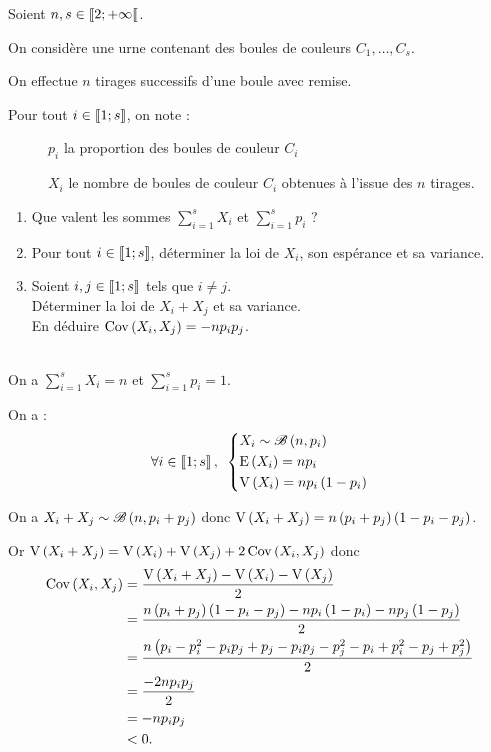 \begin{exo}[Exercice 9]
Soient \(n,s\in\left\llbracket2;+\infty\right\llbracket\).

On considère une urne contenant des boules de couleurs \(C_1,\dots,C_s\).

On effectue \(n\) tirages successifs d'une boule avec remise.

Pour tout \(i\in\left\llbracket1;s\right\rrbracket\), on note : \begin{description}
    \item[] \(p_i\) la proportion des boules de couleur \(C_i\)
    \item[] \(X_i\) le nombre de boules de couleur \(C_i\) obtenues à l'issue des \(n\) tirages.
\end{description}

\begin{enumerate}
    \item Que valent les sommes \(\sum_{i=1}^sX_i\) et \(\sum_{i=1}^sp_i\) ? \\
    \item Pour tout \(i\in\left\llbracket1;s\right\rrbracket\), déterminer la loi de \(X_i\), son espérance et sa variance. \\
    \item Soient \(i,j\in\left\llbracket1;s\right\rrbracket\) tels que \(i\not=j\). \\ Déterminer la loi de \(X_i+X_j\) et sa variance. \\ En déduire \(\operatorname{Cov}\left(X_i,X_j\right)=-np_ip_j\).
\end{enumerate}
\end{exo}

\begin{corr}[1]~\\
On a \(\sum_{i=1}^sX_i=n\) et \(\sum_{i=1}^sp_i=1\).
\end{corr}

\begin{corr}[2]
On a : \[\quantifs{\forall i\in\interventierii{1}{s}}\begin{dcases}
X_i\sim\loibinomiale{n}{p_i} \\
\esp{X_i}=np_i \\
\vari{X_i}=np_i\paren{1-p_i}
\end{dcases}\]
\end{corr}

\begin{corr}[3]
On a \(X_i+X_j\sim\mathscr{B}\left(n,p_i+p_j\right)\) donc \(\operatorname{V}\left(X_i+X_j\right)=n\left(p_i+p_j\right)\left(1-p_i-p_j\right)\).

Or \(\operatorname{V}\left(X_i+X_j\right)=\operatorname{V}\left(X_i\right)+\operatorname{V}\left(X_j\right)+2\operatorname{Cov}\left(X_i,X_j\right)\) donc \[\begin{aligned}
\operatorname{Cov}\left(X_i,X_j\right)&=\dfrac{\operatorname{V}\left(X_i+X_j\right)-\operatorname{V}\left(X_i\right)-\operatorname{V}\left(X_j\right)}{2} \\
&=\dfrac{n\left(p_i+p_j\right)\left(1-p_i-p_j\right)-np_i\left(1-p_i\right)-np_j\left(1-p_j\right)}{2} \\
&=\dfrac{n\left(p_i-p_i^2-p_ip_j+p_j-p_ip_j-p_j^2-p_i+p_i^2-p_j+p_j^2\right)}{2} \\
&=\dfrac{-2np_ip_j}{2} \\
&=-np_ip_j \\
&<0.
\end{aligned}\]
\end{corr}

